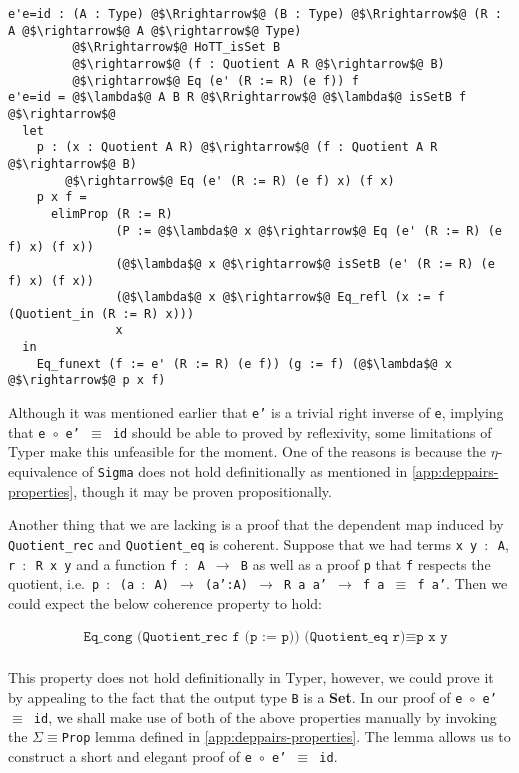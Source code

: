 \documentclass[12pt,twoside,maitrise]{dms}
\theoremstyle{definition}
\numberwithin{equation}{section}
\numberwithin{table}{chapter}
\numberwithin{figure}{chapter}
\newcommand\id[1] {\texttt{#1}}
\newcommand\fn[1] {\texttt{#1}}
\begin{document}
\begin{verbatim}
e'e=id : (A : Type) @$\Rrightarrow$@ (B : Type) @$\Rrightarrow$@ (R : A @$\rightarrow$@ A @$\rightarrow$@ Type)
         @$\Rrightarrow$@ HoTT_isSet B
         @$\rightarrow$@ (f : Quotient A R @$\rightarrow$@ B)
         @$\rightarrow$@ Eq (e' (R := R) (e f)) f
e'e=id = @$\lambda$@ A B R @$\Rrightarrow$@ @$\lambda$@ isSetB f @$\rightarrow$@
  let
    p : (x : Quotient A R) @$\rightarrow$@ (f : Quotient A R @$\rightarrow$@ B)
        @$\rightarrow$@ Eq (e' (R := R) (e f) x) (f x)
    p x f =
      elimProp (R := R)
               (P := @$\lambda$@ x @$\rightarrow$@ Eq (e' (R := R) (e f) x) (f x))
               (@$\lambda$@ x @$\rightarrow$@ isSetB (e' (R := R) (e f) x) (f x))
               (@$\lambda$@ x @$\rightarrow$@ Eq_refl (x := f (Quotient_in (R := R) x)))
               x
  in
    Eq_funext (f := e' (R := R) (e f)) (g := f) (@$\lambda$@ x @$\rightarrow$@ p x f)
\end{verbatim}

Although it was mentioned earlier that \id{e'} is a trivial right inverse of
\id{e}, implying that \fn{e $\circ{}$ e' $\equiv$ id} should be able to proved
by reflexivity, some limitations of Typer make this unfeasible for the moment.
One of the reasons is because the $\eta$-equivalence of \id{Sigma} does not hold
definitionally as mentioned in \autoref{app:deppairs-properties}, though it may
be proven propositionally.

Another thing that we are lacking is a proof that the dependent map induced by
\id{Quotient\_rec} and \id{Quotient\_eq} is coherent. Suppose that we had terms
\fn{x y $\colon$ A}, \fn{r $\colon$ R x y} and a function \fn{f $\colon$ A $\rightarrow$ B} as well as a
proof \id{p} that \id{f} respects the quotient, i.e.\ \fn{p $\colon$ (a $\colon$ A) $\rightarrow$
  (a':A) $\rightarrow$ R a a' $\rightarrow$ f a $\equiv$ f a'}. Then we could
expect the below coherence property to hold:

\begin{align*}
  & \fn{Eq\_cong (Quotient\_rec f (p := p)) (Quotient\_eq r)} \equiv \fn{p x y} \\
\end{align*}

This property does not hold definitionally in Typer, however, we could prove it
by appealing to the fact that the output type \id{B} is a \textbf{Set}. In our
proof of \fn{e $\circ{}$ e' $\equiv$ id}, we shall make use of both of the above
properties manually by invoking the \id{$\Sigma$$\equiv$Prop} lemma defined in
\autoref{app:deppairs-properties}. The lemma allows us to construct a short and
elegant proof of \fn{e $\circ{}$ e' $\equiv$ id}.
\end{document}
